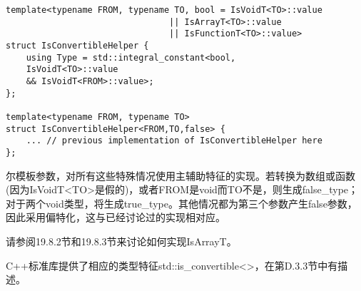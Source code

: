 \begin{lstlisting}[style=styleCXX]
template<typename FROM, typename TO, bool = IsVoidT<TO>::value
								|| IsArrayT<TO>::value
								|| IsFunctionT<TO>::value>
struct IsConvertibleHelper {
	using Type = std::integral_constant<bool,
	IsVoidT<TO>::value
	&& IsVoidT<FROM>::value>;
};

template<typename FROM, typename TO>
struct IsConvertibleHelper<FROM,TO,false> {
	... // previous implementation of IsConvertibleHelper here
};
\end{lstlisting}

尔模板参数，对所有这些特殊情况使用主辅助特征的实现。若转换为数组或函数(因为IsVoidT<TO>是假的)，或者FROM是void而TO不是，则生成false\_type；对于两个void类型，将生成true\_type。其他情况都为第三个参数产生false参数，因此采用偏特化，这与已经讨论过的实现相对应。

请参阅19.8.2节和19.8.3节来讨论如何实现IsArrayT。

C++标准库提供了相应的类型特征std::is\_convertible<>，在第D.3.3节中有描述。



